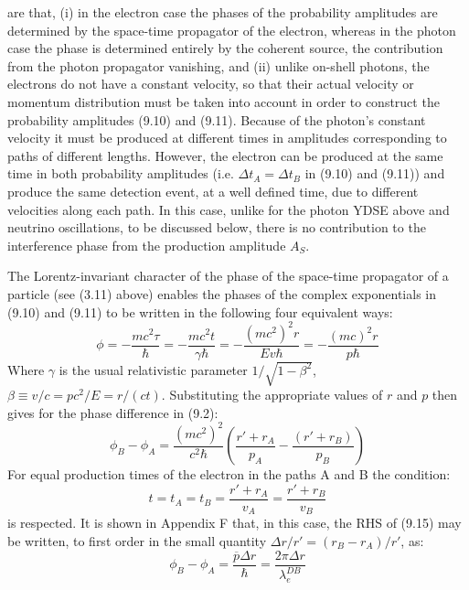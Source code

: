 \documentclass [12pt]{article}
\begin{document}
{     are that, (i) in the electron case the phases of the probability
   amplitudes are determined by the space-time propagator of the electron, whereas in the photon
    case the phase is determined entirely by the coherent source, the contribution from the
   photon propagator vanishing, and (ii) unlike on-shell photons, the electrons do not
    have a constant velocity, so that their actual  velocity or momentum distribution must be taken into
   account in order to construct the probability amplitudes (9.10) and (9.11).
     Because of the photon's constant velocity it must be produced at different 
    times in amplitudes corresponding to paths of different lengths. However, the electron
    can be produced at the same time in both probability amplitudes (i.e. $\Delta t_A = \Delta t_B$ in (9.10) and (9.11))
    and produce the same detection event, at a well defined time, due to different
   velocities along each path. In this case, unlike for the photon YDSE above and neutrino oscillations,
    to be discussed below, there is no contribution to the interference phase from the production
    amplitude $A_S$.
    \par The Lorentz-invariant character of the phase of the space-time propagator of a particle (see (3.11) above)
      enables the phases of the complex exponentials in (9.10) and (9.11) to be written in the following four
     equivalent ways:
  \begin{equation}
   \phi = -\frac{mc^2 \tau}{\hbar} = -\frac{mc^2 t}{ \gamma \hbar} = 
 -\frac{(mc^2)^2  r}{ E v \hbar} = -\frac{(mc)^2 r}{ p \hbar }
 \end{equation}
    Where $\gamma$ is the usual relativistic parameter $1/\sqrt{1-\beta^2}$, $\beta \equiv v/c = pc^2/E = r/(ct)$. 
   Substituting the appropriate values of $r$ and $p$ then gives for the phase difference in (9.2):
   \begin{equation}
   \phi_B -\phi_A = \frac{(mc^2)^2}{c^2 \hbar}\left(\frac{r'+r_A}{p_A}-\frac{(r'+r_B)}{p_B}\right)
   \end{equation}
    For equal production times of the electron in the paths A and B the condition:
   \begin{equation}
      t =   t_A = t_B =\frac{r'+r_A}{v_A} = \frac{r'+r_B}{v_B}
  \end{equation}
    is respected. It is shown in Appendix F that, in this case, the RHS of (9.15)
    may be written, to first order in the small quantity $\Delta r/r' = (r_B-r_A)/r'$, as:
      \begin{equation}
   \phi_B -\phi_A = \frac{\overline{p} \Delta r}{\hbar} =  \frac{2 \pi \Delta r}{ \lambda_e^{DB}}

\end{equation}}
\end{document}
